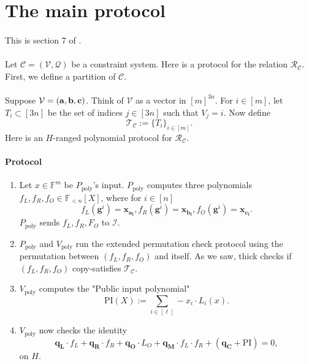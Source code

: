 \documentclass[11pt]{article}
\newcommand{\field}{\mathbb{F}}
\newcommand{\gen}{\mathbf{g}}
\begin{document}
\section{The main protocol}
\paragraph{} This is section 7 of \cite{plonk}.

\paragraph{} Let $\mathscr{C} = (\mathcal{V}, \mathcal{Q})$ be a constraint system. Here is a protocol for the relation $\mathcal{R}_\mathscr{C}$. First, we define a partition of $\mathscr{C}$.

\paragraph{} Suppose $\mathcal{V} = (\bf a, \bf b, \bf c)$. Think of $\mathcal{V}$ as a vector in $[m]^{3n}$. For $i \in [m]$, let $T_i \subset [3n]$ be the set of indices $j \in [3n]$ such that $V_j = i$. Now define
\[ \mathcal{T}_\mathscr{C} := \{ T_i \}_{i \in [m]}. \]
Here is an $H$-ranged polynomial protocol for $\mathcal{R}_\mathscr{C}$.

\paragraph{Protocol}
\begin{enumerate}
    \item Let $x \in \field^m$ be $P_\text{poly}$'s input. $P_\text{poly}$ computes three polynomials $f_L, f_R, f_O \in \field_{<n}[X]$, where for $i \in [n]$
    \[ f_L(\gen^i) = \mathbf{x_{a_i}}, f_R(\gen^i) = \mathbf{x_{b_i}}, f_O(\gen^i) = \mathbf{x_{c_i}}. \]
    $P_\text{poly}$ sends $f_L, f_R, F_O$ to $\mathcal{I}$.

    \item $P_\text{poly}$ and $V_\text{poly}$ run the extended permutation check protocol using the permutation between $(f_L, f_R, f_O)$ and itself. As we saw, thick checks if $(f_L, f_R, f_O)$ copy-satisfies $\mathcal{T}_{\mathscr{C}}$.
    
    \item $V_\text{poly}$ computes the "Public input polynomial"
    \[ \text{PI}(X) := \sum_{i \in [\ell]} -x_i \cdot L_i(x). \]

    \item $V_\text{poly}$ now checks the identity
    \[ \mathbf{q_L} \cdot f_L + \mathbf{q_R} \cdot f_R + \mathbf{q_O} \cdot L_O + \mathbf{q_M} \cdot f_L \cdot f_R + (\mathbf{q_C} + \text{PI}) = 0, \]
    on $H$.
\end{enumerate}
\end{document}
